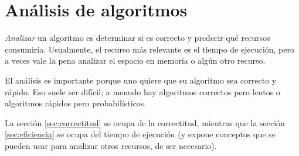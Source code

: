 \part{Análisis de algoritmos}

\emph{Analizar} un algoritmo es determinar si es correcto y predecir qué recursos consumiría. Usualmente, el recurso más relevante es el tiempo de ejecución, pero a veces vale la pena analizar el espacio en memoria o algún otro recurso.

El análisis es importante porque uno quiere que su algoritmo sea correcto y rápido. Eso suele ser difícil; a menudo hay algoritmos correctos pero lentos o algoritmos rápidos pero probabilísticos.

La sección \ref{sec:correctitud} se ocupa de la correctitud, mientras que la sección \ref{sec:eficiencia} se ocupa del tiempo de ejecución (y expone conceptos que se pueden usar para analizar otros recursos, de ser necesario).